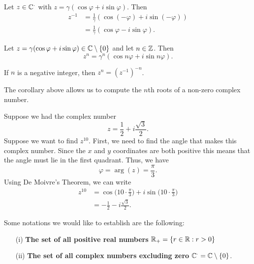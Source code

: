 \documentclass[a4paper]{report}
\begin{document}
\begin{corollary}
    Let \( z \in \mathbb{C}^{\cdot} \) with \( z = \gamma (\cos \varphi + i \sin \varphi) \). Then \begin{align*}
        z^{-1} &= \frac{ 1  }{  \gamma  }  ( \cos (- \varphi) + i \sin (- \varphi)) \\
               &= \frac{ 1 }{  \gamma  }  (\cos \varphi - i \sin \varphi).
    \end{align*}
\end{corollary}


\begin{corollary}
   Let \( z = \gamma (\cos \varphi + i \sin \varphi) \in \mathbb{C} \setminus  \{ 0 \}  \) and let \( n \in \mathbb{Z}   \). Then
   \[  z^{n} = \gamma^{n} (\cos n \varphi + i \sin n \varphi). \]
\end{corollary}

\begin{remark}
 If \( n  \) is a negative integer, then \( z^{n} = (z^{-1})^{-n} \). 
\end{remark}

The corollary above allows us to compute the \( n \)th roots of a non-zero complex number.

\begin{eg}
   Suppose we had the complex number  
   \[  z = \frac{ 1 }{ 2 }  + i \frac{ \sqrt{ 3 }  }{ 2 }. \]
  Suppose we want to find \( z^{10} \). First, we need to find the angle that makes this complex number. Since the \( x  \) and \( y  \) coordinates are both positive this means that the angle must lie in the first quadrant. Thus, we have 
  \[  \varphi = \arg(z) = \frac{ \pi }{ 3  }. \]
  Using De Moivre's Theorem, we can write
  \begin{align*}
      z^{10 } &= \cos \Big(  10 \cdot \frac{ \pi  }{ 3 }  \Big) + i \sin \Big(  10 \cdot \frac{ \pi }{ 3 }  \Big) \\
              &= -\frac{1 }{ 2 }  - i \frac{ \sqrt{ 3 }  }{ 2 }. 
  \end{align*}
\end{eg}

Some notations we would like to establish are the following:
\begin{enumerate}
    \item[(i)] \textbf{The set of all positive real numbers} \( {\mathbb{R}}_{+} = \{ r \in \mathbb{R} : r > 0  \}  \)
    \item[(ii)] \textbf{The set of all complex numbers excluding zero} \( \mathbb{C}^{\cdot} =  \mathbb{C} \setminus \{ 0 \}  \).
\end{enumerate}
\end{document}
